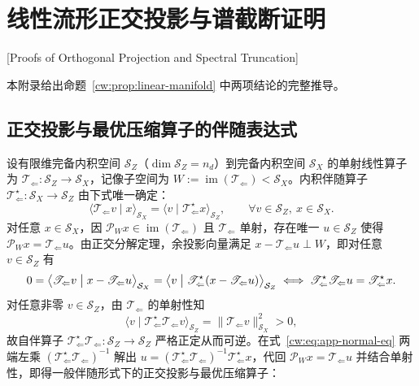 \chapter{线性流形正交投影与谱截断证明}[Proofs of Orthogonal Projection and Spectral Truncation]\label{cw:app:manifold}

本附录给出命题~\ref{cw:prop:linear-manifold} 中两项结论的完整推导。

\section{正交投影与最优压缩算子的伴随表达式}

设有限维完备内积空间 $\mathcal S_Z$（$\dim\mathcal S_Z=n_d$）到完备内积空间 $\mathcal S_X$ 的单射线性算子为 $\mathscr T_{\Leftarrow}:\mathcal S_Z\to\mathcal S_X$，记像子空间为 $W:=\operatorname{im}(\mathscr T_{\Leftarrow})<\mathcal S_X$。内积伴随算子 $\mathscr T_{\Leftarrow}^{\star}:\mathcal S_X\to\mathcal S_Z$ 由下式唯一确定：
\begin{equation}\label{cw:eq:app-adjoint-def}
\langle\mathscr T_{\Leftarrow}v\mid x\rangle_{\mathcal S_X}
=\langle v\mid\mathscr T_{\Leftarrow}^{\star}x\rangle_{\mathcal S_Z},\qquad
\forall v\in\mathcal S_Z,\ x\in\mathcal S_X.
\end{equation}
对任意 $x\in\mathcal S_X$，因 $\mathscr P_W x\in\operatorname{im}(\mathscr T_{\Leftarrow})$ 且 $\mathscr T_{\Leftarrow}$ 单射，存在唯一 $u\in\mathcal S_Z$ 使得 $\mathscr P_W x=\mathscr T_{\Leftarrow}u$。由正交分解定理，余投影向量满足 $x-\mathscr T_{\Leftarrow}u\perp W$，即对任意 $v\in\mathcal S_Z$ 有
\begin{equation}\label{cw:eq:app-normal-eq}
0=\bigl\langle\mathscr T_{\Leftarrow}v\bigm|x-\mathscr T_{\Leftarrow}u\bigr\rangle_{\mathcal S_X}
=\bigl\langle v\bigm|\mathscr T_{\Leftarrow}^{\star}(x-\mathscr T_{\Leftarrow}u)\bigr\rangle_{\mathcal S_Z}
\iff\mathscr T_{\Leftarrow}^{\star}\mathscr T_{\Leftarrow}u=\mathscr T_{\Leftarrow}^{\star}x.
\end{equation}
对任意非零 $v\in\mathcal S_Z$，由 $\mathscr T_{\Leftarrow}$ 的单射性知
\begin{equation}
\langle v\mid\mathscr T_{\Leftarrow}^{\star}\mathscr T_{\Leftarrow}v\rangle_{\mathcal S_Z}
=\|\mathscr T_{\Leftarrow}v\|_{\mathcal S_X}^2>0,
\end{equation}
故自伴算子 $\mathscr T_{\Leftarrow}^{\star}\mathscr T_{\Leftarrow}:\mathcal S_Z\to\mathcal S_Z$ 严格正定从而可逆。在式~\eqref{cw:eq:app-normal-eq} 两端左乘 $(\mathscr T_{\Leftarrow}^{\star}\mathscr T_{\Leftarrow})^{-1}$ 解出 $u=(\mathscr T_{\Leftarrow}^{\star}\mathscr T_{\Leftarrow})^{-1}\mathscr T_{\Leftarrow}^{\star}x$，代回 $\mathscr P_W x=\mathscr T_{\Leftarrow}u$ 并结合单射性，即得一般伴随形式下的正交投影与最优压缩算子：

